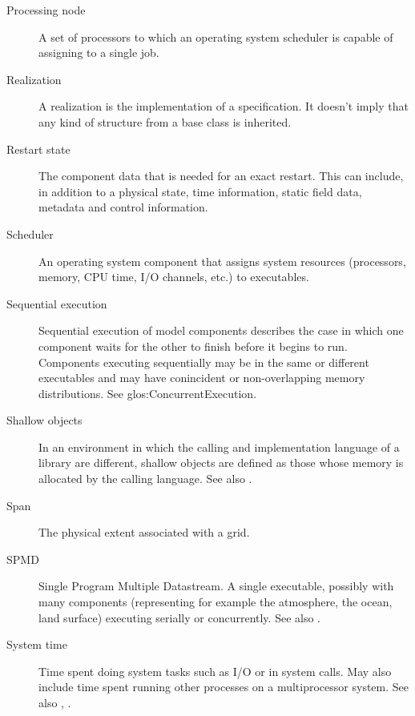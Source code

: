 \begin{description}
\item[Processing node] \label{glos:Pnode} A set of processors to which an
  operating system scheduler is capable of assigning to a single job.

\item[Realization] \label{glos:Realization} A realization is the 
  implementation of a specification.  It doesn't imply that any kind
  of structure from a base class is inherited.

\item[Restart state] \label{glos:RestartState} The component 
  data that is needed for an exact restart. This can include, 
  in addition to a physical state, time information, static field data,
  metadata and control information. 

\item[Scheduler] \label{glos:Scheduler} An operating system component 
  that assigns system resources (processors, memory, CPU time, 
  I/O channels, etc.) to executables.

\item[Sequential execution] \label{glos:SequentialExecution}
  Sequential execution of model components describes the case in which 
  one component waits for the other to finish before it begins
  to run.  Components executing sequentially may be in the same or 
  different executables and may have conincident or non-overlapping 
  memory distributions.  See 
  {glos:ConcurrentExecution}.

\item[Shallow objects] \label{glos:ShallowObjects} In an environment
  in which the calling and implementation language of a library are
  different, shallow objects are defined as those whose memory is 
  allocated by the calling language. 
  See also .

\item[Span] \label{glos:Span} The physical extent associated with a grid.

\item[SPMD] \label{glos:SPMD} Single Program Multiple Datastream. 
  A single executable, possibly with many components (representing 
  for example the atmosphere, the ocean, land surface) executing 
  serially or concurrently. See also . 

\item [System time] \label{glos:SysTime}Time spent doing system tasks 
  such as I/O or in system calls.  May also include time spent running 
  other processes on a multiprocessor system. See also , .


\end{description}
